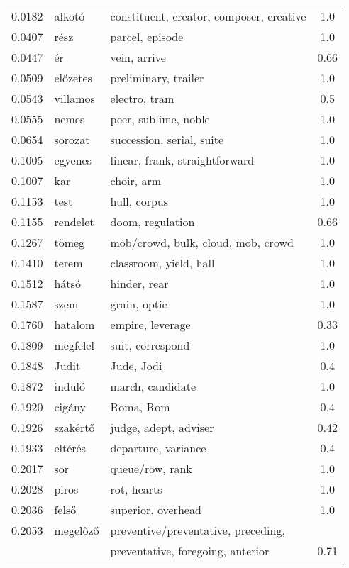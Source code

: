 \documentclass[11pt]{article}
\begin{document}
\begin{table*}
  \begin{tabular}{cllc}
  0.0182 & alkotó 	& constituent, creator, composer, creative	&  1.0 \\
  0.0407 & rész 	& parcel, episode	&  1.0 \\
  0.0447 & ér 	& vein, arrive	&  0.66 \\
  0.0509 & előzetes 	& preliminary, trailer	&  1.0 \\
  0.0543 & villamos 	& electro, tram	&  0.5 \\
  0.0555 & nemes 	& peer, sublime, noble	&  1.0 \\
  0.0654 & sorozat 	& succession, serial, suite	&  1.0 \\
  0.1005 & egyenes 	& linear, frank, straightforward	&  1.0 \\
  0.1007 & kar 	& choir, arm	&  1.0 \\
  0.1153 & test 	& hull, corpus	&  1.0 \\
  0.1155 & rendelet 	& doom, regulation	&  0.66 \\
  0.1267 & tömeg 	& mob/crowd, bulk, cloud, mob, crowd	&  1.0 \\
  0.1410 & terem 	& classroom, yield, hall	&  1.0 \\
  0.1512 & hátsó 	& hinder, rear	&  1.0 \\
  0.1587 & szem 	& grain, optic	&  1.0 \\
  0.1760 & hatalom 	& empire, leverage	&  0.33 \\
  0.1809 & megfelel 	& suit, correspond	&  1.0 \\
  0.1848 & Judit 	& Jude, Jodi	&  0.4 \\
  0.1872 & induló 	& march, candidate	&  1.0 \\
  0.1920 & cigány 	& Roma, Rom	&  0.4 \\
  0.1926 & szakértő 	& judge, adept, adviser	& 0.42 \\
  0.1933 & eltérés 	& departure, variance	&  0.4 \\
  0.2017 & sor 	& queue/row, rank	&  1.0 \\
  0.2028 & piros 	& rot, hearts	&  1.0 \\
  0.2036 & felső 	& superior, overhead	&  1.0 \\
    0.2053 & megelőző 	& preventive/preventative, preceding,
    \\&&\hspace{1cm}preventative, foregoing, anterior	&  0.71 \\

\end{tabular}
\end{table*}
\end{document}

